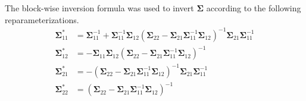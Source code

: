 \documentclass[useAMS,referee]{biom}
\begin{document}
The block-wise inversion formula was used to invert $\boldsymbol\Sigma$ according to the following reparameterizations.
\begin{align*}
\boldsymbol\Sigma_{11}^* & = \boldsymbol\Sigma_{11}^{-1} + \boldsymbol\Sigma_{11}^{-1}\boldsymbol\Sigma_{12}(\boldsymbol\Sigma_{22} - \boldsymbol\Sigma_{21}\boldsymbol\Sigma_{11}^{-1}\boldsymbol\Sigma_{12})^{-1}\boldsymbol\Sigma_{21}\boldsymbol\Sigma_{11}^{-1}\\
\boldsymbol\Sigma_{12}^* & = -\boldsymbol\Sigma_{11} \boldsymbol\Sigma_{12}(\boldsymbol\Sigma_{22}-\boldsymbol\Sigma_{21}\boldsymbol\Sigma_{11}^{-1}\boldsymbol\Sigma_{12})^{-1}\\
\boldsymbol\Sigma_{21}^* & = -(\boldsymbol\Sigma_{22} - \boldsymbol\Sigma_{21}\boldsymbol\Sigma_{11}^{-1}\boldsymbol\Sigma_{12})^{-1}\boldsymbol\Sigma_{21}\boldsymbol\Sigma_{11}^{-1}\\
\boldsymbol\Sigma_{22}^* & = (\boldsymbol\Sigma_{22} - \boldsymbol\Sigma_{21}\boldsymbol\Sigma_{11}^{-1}\boldsymbol\Sigma_{12})^{-1}     
\end{align*}



%
%   
% 

\newpage
\end{document}
